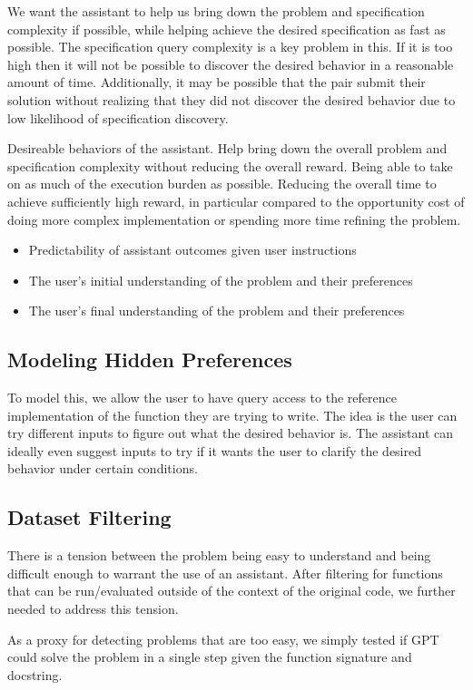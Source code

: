 \documentclass{article}
\begin{document}
We want the assistant to help us bring down the problem and specification complexity if possible, while helping achieve the desired specification as fast as possible. The specification query complexity is a key problem in this. If it is too high then it will not be possible to discover the desired behavior in a reasonable amount of time. Additionally, it may be possible that the pair submit their solution without realizing that they did not discover the desired behavior due to low likelihood of specification discovery.

Desireable behaviors of the assistant. Help bring down the overall problem and specification complexity without reducing the overall reward. Being able to take on as much of the execution burden as possible. Reducing the overall time to achieve sufficiently high reward, in particular compared to the opportunity cost of doing more complex implementation or spending more time refining the problem.
\begin{itemize}
    \item Predictability of assistant outcomes given user instructions
    \item The user's initial understanding of the problem and their preferences
    \item The user's final understanding of the problem and their preferences
\end{itemize}

\subsection{Modeling Hidden Preferences}
To model this, we allow the user to have query access to the reference implementation of the function they are trying to write. The idea is the user can try different inputs to figure out what the desired behavior is. The assistant can ideally even suggest inputs to try if it wants the user to clarify the desired behavior under certain conditions.

\subsection{Dataset Filtering}
There is a tension between the problem being easy to understand and being difficult enough to warrant the use of an assistant. After filtering for functions that can be run/evaluated outside of the context of the original code, we further needed to address this tension.

As a proxy for detecting problems that are too easy, we simply tested if GPT could solve the problem in a single step given the function signature and docstring. 
\end{document}
